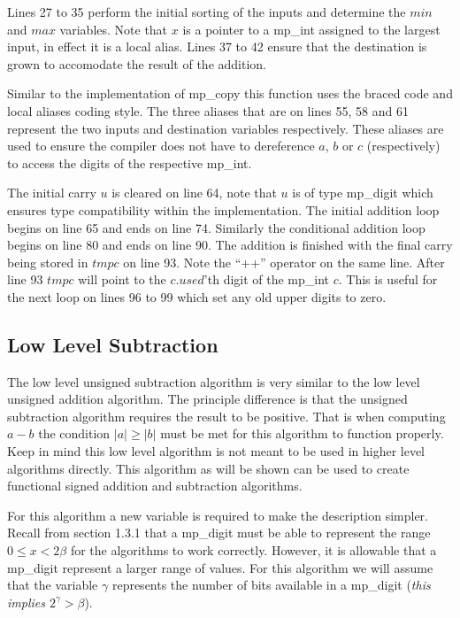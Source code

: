 \documentclass[b5paper]{book}
\begin{document}
Lines 27 to 35 perform the initial sorting of the inputs and determine the $min$ and $max$ variables.  Note that $x$ is a pointer to a 
mp\_int assigned to the largest input, in effect it is a local alias.  Lines 37 to 42 ensure that the destination is grown to 
accomodate the result of the addition. 

Similar to the implementation of mp\_copy this function uses the braced code and local aliases coding style.  The three aliases that are on 
lines 55, 58 and 61 represent the two inputs and destination variables respectively.  These aliases are used to ensure the
compiler does not have to dereference $a$, $b$ or $c$ (respectively) to access the digits of the respective mp\_int.

The initial carry $u$ is cleared on line 64, note that $u$ is of type mp\_digit which ensures type compatibility within the 
implementation.  The initial addition loop begins on line 65 and ends on line 74.  Similarly the conditional addition loop
begins on line 80 and ends on line 90.  The addition is finished with the final carry being stored in $tmpc$ on line 93.  
Note the ``++'' operator on the same line.  After line 93 $tmpc$ will point to the $c.used$'th digit of the mp\_int $c$.  This is useful
for the next loop on lines 96 to 99 which set any old upper digits to zero.

\subsection{Low Level Subtraction}
The low level unsigned subtraction algorithm is very similar to the low level unsigned addition algorithm.  The principle difference is that the
unsigned subtraction algorithm requires the result to be positive.  That is when computing $a - b$ the condition $\vert a \vert \ge \vert b\vert$ must 
be met for this algorithm to function properly.  Keep in mind this low level algorithm is not meant to be used in higher level algorithms directly.  
This algorithm as will be shown can be used to create functional signed addition and subtraction algorithms.


For this algorithm a new variable is required to make the description simpler.  Recall from section 1.3.1 that a mp\_digit must be able to represent
the range $0 \le x < 2\beta$ for the algorithms to work correctly.  However, it is allowable that a mp\_digit represent a larger range of values.  For 
this algorithm we will assume that the variable $\gamma$ represents the number of bits available in a 
mp\_digit (\textit{this implies $2^{\gamma} > \beta$}).  
\end{document}
